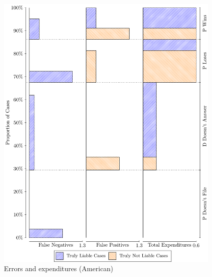 \documentclass{article}
\begin{document}
\begin{figure}
    \centering
    \begin{minipage}{0.48\textwidth}
        \centering
        \includegraphics[width=0.98\textwidth, scale=0.70, trim={0in 0in 0in 0in}, clip]{../Figures/Source of error costs and expenditures (American)} %
        \caption{Errors and expenditures (American)}
		\label{fig:errors_american}
    \end{minipage}\hfill
    \begin{minipage}{0.48\textwidth}
        \centering

\end{minipage}
\end{figure}
\end{document}
